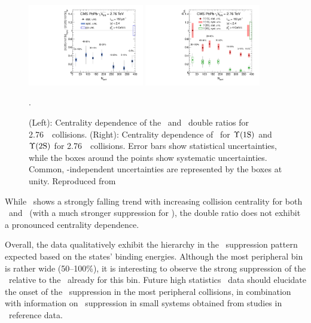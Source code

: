 \begin{figure}[t]
\begin{center}
   \includegraphics[width=0.45\textwidth]{qqbarfigures/chi2VsCent}
   \includegraphics[width=0.45\textwidth]{qqbarfigures/RaaPt4}
  \caption{(Left): Centrality dependence of the \PgUa\ and \PgUb\ double ratios
for 2.76\TeV\ \PbPb\ collisions.  (Right):
Centrality dependence of \Raa\ for $\Upsilon\mathrm{(1S)}$ and $\Upsilon\mathrm{(2S)}$ for 2.76\TeV\ \PbPb\ collisions.
Error bars show statistical uncertainties, while the boxes around the points
show systematic uncertainties. Common, \npart-independent
uncertainties are represented by the boxes at unity. Reproduced from~\cite{Chatrchyan:2012lxa}}.
\label{fig:GR:centrality}
\end{center}
\end{figure}

While \Raa\ shows a strongly falling trend with increasing collision centrality
for both \PgUa\ and \PgUb\ (with a much stronger suppression for \PgUb), the
double ratio does not exhibit a pronounced centrality dependence.

Overall, the data qualitatively exhibit the hierarchy in the \PgUn\ suppression pattern
expected based on the states' binding energies. Although the most peripheral bin
is rather wide (50--100\%), it is interesting to observe the strong suppression of the
\PgUb\ relative to the \PgUa\ already for this bin. Future high statistics \PbPb\ data
should elucidate the onset of the \PgU\ suppression in the most peripheral collisions,
in combination with information on \PgU\ suppression in small systems obtained from
studies in \pPb\ reference data.

